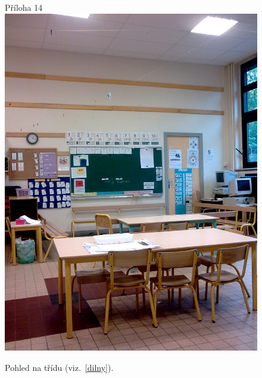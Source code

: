 	\begin{figure}[tb]
		\centering
		Příloha 14\\
		\includegraphics[height=0.35\textheight]{./fotky/Obr14.jpg}
		\caption{
			Pohled na třídu (viz.~\ref{dilny}).
		}
		\label{Obr14}
	\end{figure}

